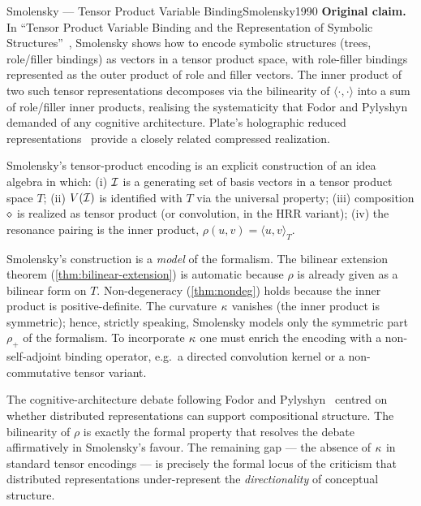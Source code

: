 \begin{zooentry}{Smolensky --- Tensor Product Variable Binding}{Smolensky1990}
\textbf{Original claim.} In ``Tensor Product Variable Binding and the
Representation of Symbolic Structures''~\cite{Smolensky1990}, Smolensky
shows how to encode symbolic structures (trees, role/filler bindings) as
vectors in a tensor product space, with role-filler bindings represented
as the outer product of role and filler vectors. The inner product of two
such tensor representations decomposes via the bilinearity of
$\langle\cdot,\cdot\rangle$ into a sum of role/filler inner products,
realising the systematicity that
Fodor and Pylyshyn~\cite{FodorPylyshyn1988} demanded of any cognitive
architecture. Plate's holographic reduced
representations~\cite{Plate1995} provide a closely related compressed
realization.

\formalclaim
Smolensky's tensor-product encoding is an explicit construction of an
idea algebra in which: (i) $\mathcal{I}$ is a generating set of basis vectors
in a tensor product space $T$; (ii) $V(\mathcal{I})$ is identified with $T$
via the universal property; (iii) composition $\mathbin{\diamond}$ is realized as
tensor product (or convolution, in the HRR variant); (iv) the resonance
pairing is the inner product, $\rho(u,v)=\langle u,v\rangle_T$.

\formalstatus
Smolensky's construction is a \emph{model} of the formalism. The
bilinear extension theorem (\cref{thm:bilinear-extension}) is automatic
because $\rho$ is already given as a bilinear form on $T$. Non-degeneracy
(\cref{thm:nondeg}) holds because the inner product is positive-definite.
The curvature $\kappa$ vanishes (the inner product is symmetric); hence,
strictly speaking, Smolensky models only the symmetric part $\rho_+$ of
the formalism. To incorporate $\kappa$ one must enrich the encoding with a
non-self-adjoint binding operator, e.g.\ a directed convolution kernel or
a non-commutative tensor variant.

\litcomment
The cognitive-architecture debate following Fodor and
Pylyshyn~\cite{FodorPylyshyn1988} centred on whether distributed
representations can support compositional structure. The bilinearity of
$\rho$ is exactly the formal property that resolves the debate
affirmatively in Smolensky's favour. The remaining gap --- the absence of
$\kappa$ in standard tensor encodings --- is precisely the formal locus of
the criticism that distributed representations under-represent the
\emph{directionality} of conceptual structure.
\end{zooentry}


